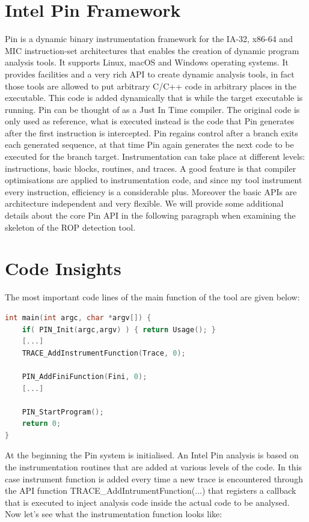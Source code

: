 \documentclass[Lau,binding=0.6cm]{sapthesis}
\begin{document}
\section{Intel Pin Framework}

Pin is a dynamic binary instrumentation framework for the IA-32, x86-64 and MIC instruction-set architectures that enables the creation of dynamic program analysis tools. It supports Linux, macOS and Windows operating systems. 
It provides facilities and a very rich API to create dynamic analysis tools, in fact those tools are allowed to put arbitrary C/C++ code in arbitrary places in the executable. This code is added dynamically that is while the target executable is running.
Pin can be thought of as a Just In Time compiler. The original code is only used as reference, what is executed instead is the code that Pin generates after the first instruction is intercepted. Pin regains control after a branch exits each generated sequence, at that time Pin again generates the next code to be executed for the branch target.
Instrumentation can take place at different levels: instructions, basic blocks, routines, and traces.
A good feature is that compiler optimisations are applied to instrumentation code, and since my tool instrument every instruction, efficiency is a considerable plus. Moreover the basic APIs are architecture independent and very flexible.
We will provide some additional details about the core Pin API in the following paragraph when examining the skeleton of the ROP detection tool.

\section{Code Insights}

The most important code lines of the main function of the tool are given below:

\begin{lstlisting}[language=C++]
int main(int argc, char *argv[]) {
	if( PIN_Init(argc,argv) ) { return Usage(); }
	[...]
	TRACE_AddInstrumentFunction(Trace, 0);
	
	PIN_AddFiniFunction(Fini, 0);
	[...]
	
	PIN_StartProgram();
	return 0;
}
\end{lstlisting}

At the beginning the Pin system is initialised. An Intel Pin analysis is based on the instrumentation routines that are added at various levels of the code. In this case instrument function is added every time a new trace is encountered through the API function TRACE\_AddIntrumentFunction(...) that registers a callback that is executed to inject analysis code inside the actual code to be analysed.
Now let’s see what the instrumentation function looks like:
\end{document}
